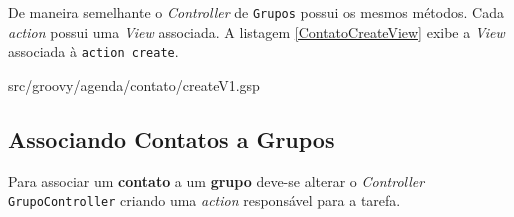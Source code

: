 \documentclass[12pt]{article}
\begin{document}
    De maneira semelhante o \emph{Controller} de \texttt{Grupos} possui os mesmos métodos. 
    Cada \emph{action} possui uma  \emph{View} associada. A listagem \ref{ContatoCreateView} 
    exibe a \emph{View} associada à \texttt{action create}.
    
    
                   {src/groovy/agenda/contato/createV1.gsp}
    
\subsection{Associando Contatos a Grupos}

    Para associar um \textbf{contato} a um \textbf{grupo} deve-se alterar o \emph{Controller}
    \texttt{GrupoController} criando uma \emph{action} responsável para a tarefa.
    
\end{document}

